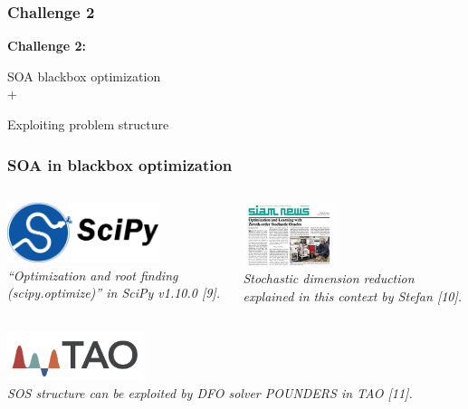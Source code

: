 \documentclass[aspectratio=169]{beamer}
\begin{document}
\begin{frame}\frametitle{Challenge 2}
\vfill
\begin{center}
{\Huge \bf
Challenge 2:\\

\bigskip

SOA blackbox optimization\\
+\\
\medskip

Exploiting problem structure
}
\end{center}
\vfill
\end{frame}

\begin{frame}\frametitle{SOA in blackbox optimization}
\begin{columns}
\begin{column}{0.5\textwidth}
\begin{center}
\includegraphics[width=0.7\textwidth]{../img/logos/logo-scipy.png}\\
{\tiny \sl
``Optimization and root finding (scipy.optimize)'' in SciPy v1.10.0 [9].\\
}
\end{center}
\end{column}
\begin{column}{0.5\textwidth}
\begin{center}
\includegraphics[height=5em]{../img/probs/siam_news_feb_23.jpg}\\
{\tiny \sl
Stochastic dimension reduction explained in this context
by Stefan [10].\\
}
\end{center}
\end{column}
\end{columns}

\bigskip

\begin{center}
\includegraphics[width=0.3\textwidth]{../img/logos/logo-tao.png}\\
{\tiny \sl
SOS structure can be exploited by DFO solver POUNDERS in TAO [11].\\
}
\end{center}


\end{frame}
\end{document}

